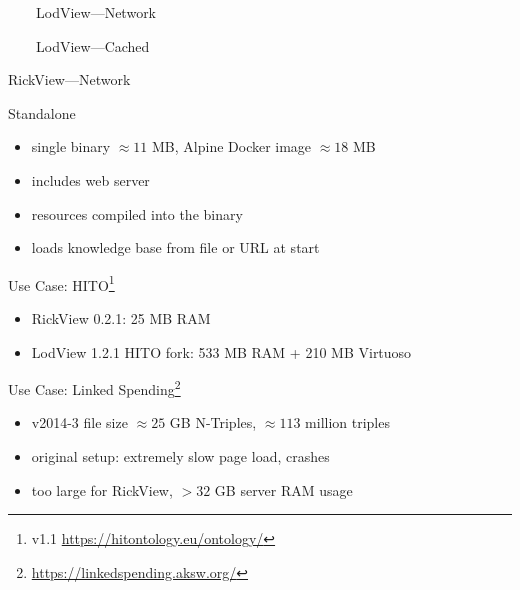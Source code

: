 \documentclass[14pt,aspectratio=169]{beamer}
\newcommand{\imageslide}[4][]
{
\begin{frame}[plain]{~~~~#2}
\vspace{0.2em}
\centering\makebox[\linewidth]{\texttt{[image: \#3]}}
\\#1
\note{#4}
\end{frame}
}
\begin{document}
\imageslide{LodView---Network}{img/lodview-nocache.png}{}
\imageslide{LodView---Cached}{img/lodview-cache.png}{}

\begin{frame}[plain]{RickView---Network}
\centering{}\\
\hspace{2em}
\pause
\centering{}
\end{frame}

\begin{frame}{Standalone}
\begin{itemize}
\item single binary $\approx 11$ MB, Alpine Docker image $\approx 18$ MB
\item includes web server
\item resources compiled into the binary
\item loads knowledge base from file or URL at start
\end{itemize}
\end{frame}

\begin{frame}{Use Case: HITO\footnote{v1.1 \url{https://hitontology.eu/ontology/}}}
\begin{itemize}
\item RickView 0.2.1: 25 MB RAM
\item LodView 1.2.1 HITO fork: 533 MB RAM + 210 MB Virtuoso
\end{itemize}
\end{frame}

\begin{frame}{Use Case: Linked Spending\footnote{\url{https://linkedspending.aksw.org/}}}
\begin{itemize}
\item v2014-3 file size $\approx 25$ GB N-Triples, $\approx 113$ million triples
\item original setup: extremely slow page load, crashes
\item too large for RickView, $> 32$ GB server RAM usage
\end{itemize}
\end{frame}
\end{document}
